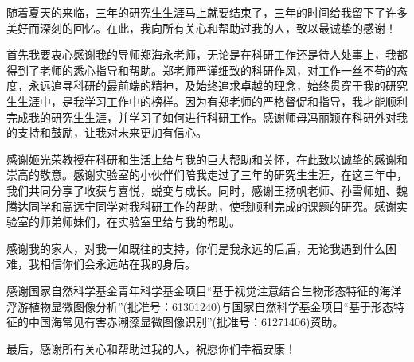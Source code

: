 
\begin{ack}
随着夏天的来临，三年的研究生生涯马上就要结束了，三年的时间给我留下了许多美好而深刻的回忆。在此，我向所有关心和帮助过我的人，致以最诚挚的感谢！

首先我要衷心感谢我的导师郑海永老师，无论是在科研工作还是待人处事上，我都得到了老师的悉心指导和帮助。郑老师严谨细致的科研作风，对工作一丝不苟的态度，永远追寻科研的最前端的精神，及始终追求卓越的理念，始终贯穿于我的研究生生涯中，是我学习工作中的榜样。因为有郑老师的严格督促和指导，我才能顺利完成我的研究生生涯，并学习了如何进行科研工作。感谢师母冯丽颖在科研外对我的支持和鼓励，让我对未来更加有信心。

感谢姬光荣教授在科研和生活上给与我的巨大帮助和关怀，在此致以诚挚的感谢和崇高的敬意。感谢实验室的小伙伴们陪我走过了三年的研究生生涯，在这三年中，我们共同分享了收获与喜悦，蜕变与成长。同时，感谢王扬帆老师、孙雪师姐、魏腾达同学和高远宁同学对我科研工作的帮助，使我顺利完成的课题的研究。感谢实验室的师弟师妹们，在实验室里给与我的帮助。

感谢我的家人，对我一如既往的支持，你们是我永远的后盾，无论我遇到什么困难，我相信你们会永远站在我的身后。

感谢国家自然科学基金青年科学基金项目“基于视觉注意结合生物形态特征的海洋浮游植物显微图像分析”(批准号：61301240)与国家自然科学基金项目“基于形态特征的中国海常见有害赤潮藻显微图像识别”(批准号：61271406)资助。

最后，感谢所有关心和帮助过我的人，祝愿你们幸福安康！


\end{ack}
